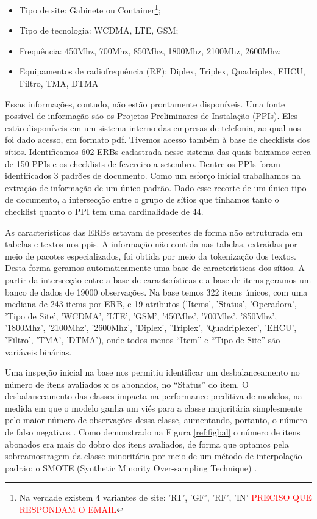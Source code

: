 \documentclass[
	12pt,				%
	openany,			%
	oneside,			%
	a4paper,			%
	english,			%
	french,				%
	spanish,			%
	brazil,				%
	]{abntex2}
\begin{document}
\begin{itemize}
\item Tipo de site: Gabinete ou Container\footnote{Na verdade existem 4 variantes de site: 'RT', 'GF', 'RF', 'IN' \textcolor{red}{PRECISO QUE RESPONDAM O EMAIL}};
\item Tipo de tecnologia: WCDMA, LTE, GSM;
\item Frequência: 450Mhz, 700Mhz, 850Mhz, 1800Mhz,  2100Mhz, 2600Mhz;
\item Equipamentos de radiofrequência (RF): Diplex, Triplex, Quadriplex, EHCU, Filtro, TMA, DTMA
\end{itemize}

Essas informações, contudo, não estão prontamente disponíveis. Uma fonte
possível de informação são os Projetos Preliminares de Instalação (PPIs). Eles
estão disponíveis em um sistema interno das empresas de telefonia, ao qual nos
foi dado acesso, em formato pdf. Tivemos acesso também à base de checklists dos
sítios. Identificamos 602 ERBs cadastrada nesse sistema das quais baixamos cerca
de 150 PPIs e os checklists de fevereiro a setembro. Dentre os PPIs foram
identificados 3 padrões de documento. Como um esforço inicial trabalhamos na
extração de informação de um único padrão. Dado esse recorte de um único tipo de
documento, a intersecção entre o grupo de sítios que tínhamos tanto o checklist
quanto o PPI tem uma cardinalidade de 44.

As características das ERBs estavam de presentes de forma não estruturada em
tabelas e textos nos ppis. A informação não contida nas tabelas, extraídas por
meio de pacotes especializados, foi obtida por meio da tokenização dos textos.
Desta forma geramos automaticamente uma base de características dos sítios. A
partir da intersecção entre a base de características e a base de items geramos
um banco de dados de 19000 observações. Na base temos 322 items únicos, com uma
mediana de 243 items por ERB, e 19 atributos ('Items', 'Status', 'Operadora',
'Tipo de Site', 'WCDMA', 'LTE', 'GSM', '450Mhz', '700Mhz', '850Mhz', '1800Mhz',
'2100Mhz', '2600Mhz', 'Diplex', 'Triplex', 'Quadriplexer', 'EHCU', 'Filtro',
'TMA', 'DTMA'), onde todos menos ``Item'' e ``Tipo de Site'' são variáveis
binárias.

Uma inspeção inicial na base nos permitiu identificar um desbalanceamento no
número de itens avaliados x os abonados, no ``Status'' do item. O
desbalanceamento das classes impacta na performance preditiva de modelos, na
medida em que o modelo ganha um viés para a classe majoritária simplesmente pelo
maior número de observações dessa classe, aumentando, portanto, o número de
falso negativos \cite{faceli2011inteligencia}. Como demonstrado na Figura
\ref{ref:figbal} o número de itens abonados era mais do dobro dos itens
avaliados, de forma que optamos pela sobreamostragem da classe minoritária por
meio de um método de interpolação padrão: o SMOTE (Synthetic Minority
Over-sampling Technique) \cite{chawla2002smote}. 
\end{document}
